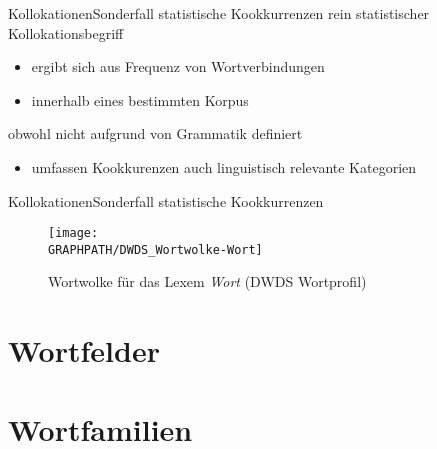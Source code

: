 \begin{frame}{Kollokationen}{Sonderfall statistische Kookkurrenzen}
\onslide<+->
rein statistischer Kollokationsbegriff
\begin{itemize}[<+->]
	\item		ergibt sich aus Frequenz von Wortverbindungen
	\item		innerhalb eines bestimmten Korpus
\end{itemize}
\onslide<+->
\Zeile
obwohl nicht aufgrund von Grammatik definiert
\begin{itemize}[<+->]
	\item		umfassen Kookkurenzen auch linguistisch relevante Kategorien
\end{itemize}
\end{frame}

\begin{frame}{Kollokationen}{Sonderfall statistische Kookkurrenzen}
\center
\begin{figure}
\texttt{[image: \\GRAPHPATH/DWDS\_Wortwolke-Wort]}
\caption{Wortwolke für das Lexem \textit{Wort} (DWDS Wortprofil)}
\end{figure}
\end{frame}

\section{Wortfelder}

\section{Wortfamilien}
